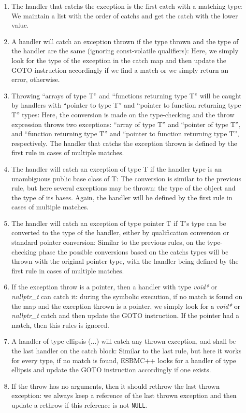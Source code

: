 \documentclass[a4paper]{llncs}
\begin{document}
\begin{enumerate}
 \item The handler that catchs the exception is the first catch with a matching type: We maintain a list with the order of
       catchs and get the catch with the lower value.
 \item A handler will catch an exception thrown if the type thrown and the type of the handler are the same (ignoring const-volatile
       qualifiers): Here, we simply look for the type of the exception in the catch map and then update the GOTO instruction accordingly 
       if we find a match or we simply return an error, otherwise.
 \item Throwing ``arrays of type T'' and ``functions returning type T'' will be caught by handlers with ``pointer to type T'' and
       ``pointer to function returning type T'' types: Here, the conversion is made on the type-checking and the throw expression 
       throws two exceptions: ``array of type T'' and ``pointer of type T'', and ``function returning type T'' and ``pointer to function 
       returning type T'', respectively. The handler that catchs the exception thrown is defined by the first rule in cases of 
       multiple  matches.
 \item The handler will catch an exception of type T if the handler type is an unambiguous public base class of T: The conversion is 
       similar to the previous rule, but here several exceptions may be thrown: the type of the object and the 
       type of its bases. Again, the handler will be defined by the first rule in cases of multiple matches.
 \item The handler will catch an exception of type pointer T if T's type can be converted to the type of the handler, either by
       qualification conversion or standard pointer conversion: Similar to the previous rules, on the type-checking phase the possible
       conversions based on the catchs types will be thrown with the original pointer type, with the handler being defined by the first 
       rule in cases of multiple matches.
 \item If the exception throw is a pointer, then a handler with type \textit{void*} or \textit{nullptr\_t} can catch it: during the 
       symbolic execution, if no match is found on the map and the exception thrown is a pointer, we simply look for a 
       \textit{void*} or \textit{nullptr\_t} catch and then update the GOTO instruction. If the pointer had a match, then this rules is 
       ignored.
 \item A handler of type ellipsis (...) will catch any thrown exception, and shall be the last handler on the catch block: Similar to the
       last rule, but here it works for every type, if no match is found, ESBMC++ looks for a handler of type ellipsis and update the GOTO
       instruction accordingly if one exists.
 \item If the throw has no arguments, then it should rethrow the last thrown exception: we always keep a reference of the last 
       thrown exception and then update a rethrow if this reference is not \verb|NULL|.
\end{enumerate}
\end{document}
